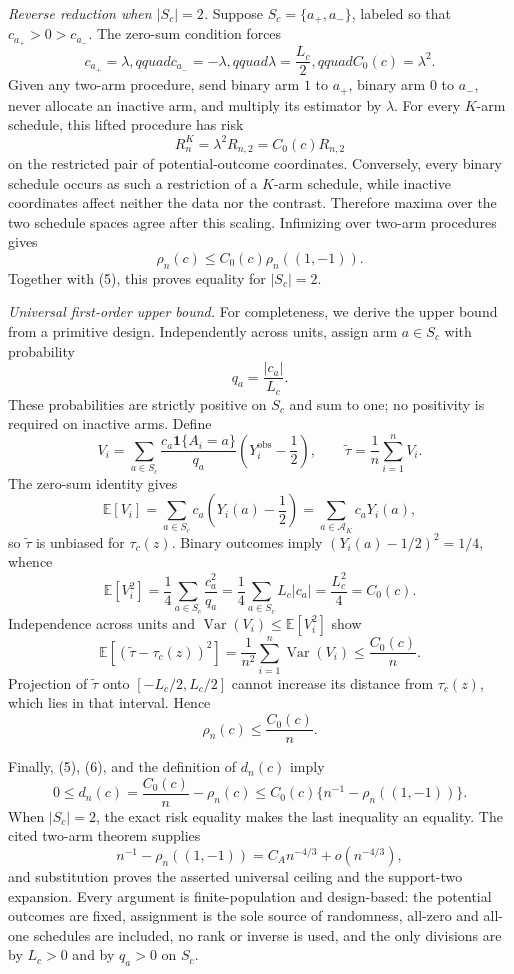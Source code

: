 \textit{Reverse reduction when \(|S_c|=2\).}
Suppose \(S_c=\{a_+,a_-\}\), labeled so that \(c_{a_+}>0>c_{a_-}\). The zero-sum condition forces
\[
 c_{a_+}=\lambda,qquad c_{a_-}=-\lambda,qquad
 \lambda=\frac{L_c}{2},qquad C_0(c)=\lambda^2.
\]
Given any two-arm procedure, send binary arm \(1\) to \(a_+\), binary arm \(0\) to \(a_-\), never allocate an inactive arm, and multiply its estimator by \(\lambda\). For every \(K\)-arm schedule, this lifted procedure has risk
\[
 R_n^{K}=\lambda^2R_{n,2}
 =C_0(c)R_{n,2}
\]
on the restricted pair of potential-outcome coordinates. Conversely, every binary schedule occurs as such a restriction of a \(K\)-arm schedule, while inactive coordinates affect neither the data nor the contrast. Therefore maxima over the two schedule spaces agree after this scaling. Infimizing over two-arm procedures gives
\[
 \rho_n(c)\leq C_0(c)\rho_n((1,-1)).
\]
Together with (5), this proves equality for \(|S_c|=2\).

\textit{Universal first-order upper bound.}
For completeness, we derive the upper bound from a primitive design. Independently across units, assign arm \(a\in S_c\) with probability
\[
 q_a=\frac{|c_a|}{L_c}.
\]
These probabilities are strictly positive on \(S_c\) and sum to one; no positivity is required on inactive arms. Define
\[
 V_i=\sum_{a\in S_c}
 \frac{c_a\mathbf 1\{A_i=a\}}{q_a}
 \left(Y_i^{\mathrm{obs}}-\frac12\right),
 \qquad
 \widetilde\tau=\frac1n\sum_{i=1}^n V_i.
\]
The zero-sum identity gives
\[
 \mathbb E[V_i]
 =\sum_{a\in S_c}c_a\left(Y_i(a)-\frac12\right)
 =\sum_{a\in\mathcal A_K}c_aY_i(a),
\]
so \(\widetilde\tau\) is unbiased for \(\tau_c(z)\). Binary outcomes imply \((Y_i(a)-1/2)^2=1/4\), whence
\[
 \mathbb E[V_i^2]
 =\frac14\sum_{a\in S_c}\frac{c_a^2}{q_a}
 =\frac14\sum_{a\in S_c}L_c|c_a|
 =\frac{L_c^2}{4}
 =C_0(c).
\]
Independence across units and \(\operatorname{Var}(V_i)\leq\mathbb E[V_i^2]\) show
\[
 \mathbb E\!\left[(\widetilde\tau-\tau_c(z))^2\right]
 =\frac1{n^2}\sum_{i=1}^n\operatorname{Var}(V_i)
 \leq\frac{C_0(c)}{n}.
\]
Projection of \(\widetilde\tau\) onto \([-L_c/2,L_c/2]\) cannot increase its distance from \(\tau_c(z)\), which lies in that interval. Hence
\[
 \rho_n(c)\leq\frac{C_0(c)}n.
 \tag{6}
\]

Finally, (5), (6), and the definition of \(d_n(c)\) imply
\[
 0\leq d_n(c)
 =\frac{C_0(c)}n-\rho_n(c)
 \leq C_0(c)\{n^{-1}-\rho_n((1,-1))\}.
\]
When \(|S_c|=2\), the exact risk equality makes the last inequality an equality. The cited two-arm theorem supplies
\[
 n^{-1}-\rho_n((1,-1))
 =C_A n^{-4/3}+o(n^{-4/3}),
\]
and substitution proves the asserted universal ceiling and the support-two expansion. Every argument is finite-population and design-based: the potential outcomes are fixed, assignment is the sole source of randomness, all-zero and all-one schedules are included, no rank or inverse is used, and the only divisions are by \(L_c>0\) and by \(q_a>0\) on \(S_c\).